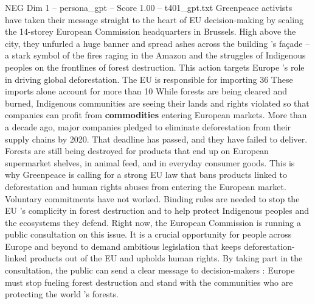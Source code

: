 \begin{textsample}{NEG Dim 1 – persona\_gpt – Score 1.00 – t401\_gpt.txt}  \label{ex:f1_neg_038}
Greenpeace activists have taken their message straight to the heart of EU decision-making by scaling the 14-storey European Commission headquarters in Brussels.
High above the city, they unfurled a huge banner and spread ashes across the building ’s façade – a stark symbol of the fires raging in the Amazon and the struggles of Indigenous peoples on the frontlines of forest destruction.
This action targets Europe ’s role in driving global deforestation.
The EU is responsible for importing 36 %
These imports alone account for more than 10 %
While forests are being cleared and burned, Indigenous communities are seeing their lands and rights violated so that companies can profit from \textbf{commodities} entering European markets.
More than a decade ago, major companies pledged to eliminate deforestation from their supply chains by 2020.
That deadline has passed, and they have failed to deliver.
Forests are still being destroyed for products that end up on European supermarket shelves, in animal feed, and in everyday consumer goods.
This is why Greenpeace is calling for a strong EU law that bans products linked to deforestation and human rights abuses from entering the European market.
Voluntary commitments have not worked.
Binding rules are needed to stop the EU ’s complicity in forest destruction and to help protect Indigenous peoples and the ecosystems they defend.
Right now, the European Commission is running a public consultation on this issue.
It is a crucial opportunity for people across Europe and beyond to demand ambitious legislation that keeps deforestation-linked products out of the EU and upholds human rights.
By taking part in the consultation, the public can send a clear message to decision-makers : Europe must stop fueling forest destruction and stand with the communities who are protecting the world ’s forests.

\end{textsample}
